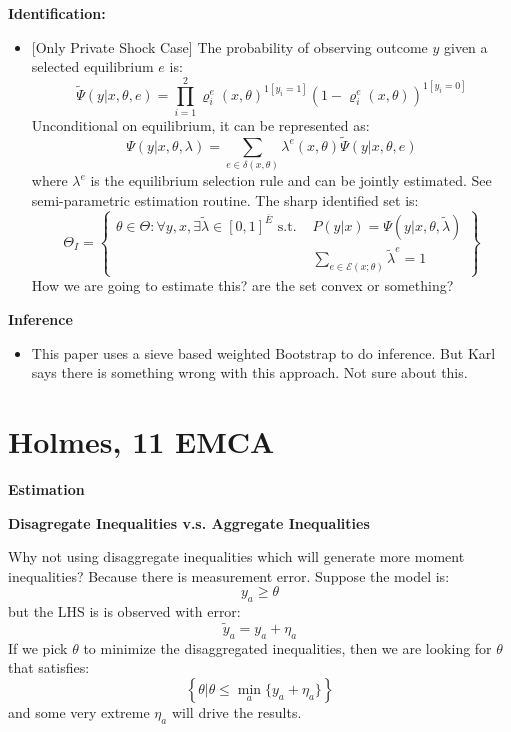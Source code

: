 \documentclass{book}
\theoremstyle{plain}
\theoremstyle{definition}
\newcommand{\red}[1]{{\color{red} #1}}
\newcommand{\mytitle}[1]{{\large{\textbf{#1}}}}
\newcommand{\mysubtitle}[1]{{\normalsize{\textbf{#1}}}}
\begin{document}
\mytitle{Identification:}
\begin{itemize}
	

	\item {[Only Private Shock Case]} The probability of observing outcome $y$ given a selected equilibrium $e$ is:
	\[\tilde { \Psi } ( y | x , \theta , e ) = \prod _ { i = 1 } ^ { 2 } \varrho _ { i } ^ { e } ( x , \theta ) ^ { 1 \left[ y _ { i } = 1 \right] } \left( 1 - \varrho _ { i } ^ { e } ( x , \theta ) \right) ^ { 1 \left[ y _ { i } = 0 \right] }\]
	Unconditional on equilibrium, it can be represented as:
	\[\Psi ( y | x , \theta , \lambda ) = \sum _ { e \in \delta ( x , \theta ) } \lambda ^ { e } ( x , \theta ) \tilde { \Psi } ( y | x , \theta , e )\]
	where $\lambda^e$ is the equilibrium selection rule and can be jointly estimated. See \cite{Tamer:2003hi} semi-parametric estimation routine.
	The sharp identified set is:
	\[\Theta _ { I } = \left\{ \begin{aligned} \theta \in \Theta : \forall y , x , \exists \tilde { \lambda } \in [ 0,1 ] ^ { \overline { E } } \text { s.t. } & P ( y | x ) = \Psi ( y | x , \theta , \tilde { \lambda } ) \\ & \sum _ { e \in \mathcal { E } ( x ; \theta ) } \tilde { \lambda } ^ { e } = 1 \end{aligned} \right\}\]
	\red{How we are going to estimate this? are the set convex or something?}
\end{itemize}

\mytitle{Inference}
\begin{itemize}
	\item This paper uses a sieve based weighted Bootstrap to do inference. But Karl says there is something wrong with this approach. Not sure about this.
\end{itemize}


\section{Holmes, 11 EMCA} %
\label{sec:holmes_2011_emca}

\mytitle{Estimation}

\mysubtitle{Disagregate Inequalities v.s. Aggregate Inequalities}

Why not using disaggregate inequalities which will generate more moment inequalities? Because there is measurement error. Suppose the model is:
\[y_a \geq \theta\]
but the LHS is is observed with error:
\[\tilde y_a = y_a + \eta_a\]
If we pick $\theta$ to minimize the disaggregated inequalities, then we are looking for $\theta$ that satisfies:
\[\left\{\theta | \theta \leq \min_{a}\{y_a+\eta_a\}\right\}\]
and some very extreme $\eta_a$ will drive the results.
\end{document}
